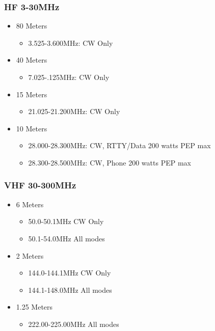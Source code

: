 \documentclass[10pt]{beamer}
\begin{document}
\begin{frame}
\frametitle{HF 3-30MHz}
	\begin{itemize}
	\item 80 Meters
		\begin{itemize}
		\item 3.525-3.600MHz: CW Only
		\end{itemize}
	\item 40 Meters
		\begin{itemize}
		\item 7.025-.125MHz: CW Only
		\end{itemize}
	\item 15 Meters
		\begin{itemize}
		\item 21.025-21.200MHz: CW Only
		\end{itemize}
	\item 10 Meters 
		\begin{itemize}
		\item  28.000-28.300MHz: CW, RTTY/Data 200 watts PEP max 
		\item 28.300-28.500MHz: CW, Phone 200 watts PEP max
		\end{itemize}
	\end{itemize}
\end{frame}

\begin{frame}
\frametitle{VHF 30-300MHz}
	\begin{itemize}
	\item 6 Meters
		\begin{itemize}
		\item 50.0-50.1MHz CW Only
		\item 50.1-54.0MHz All modes
		\end{itemize}
	\item 2 Meters
		\begin{itemize}
		\item  144.0-144.1MHz CW Only
		\item 144.1-148.0MHz All modes
		\end{itemize}
	\item 1.25 Meters
		\begin{itemize}
		\item 222.00-225.00MHz All modes
		\end{itemize}
	\end{itemize}
\end{frame}
\end{document}
